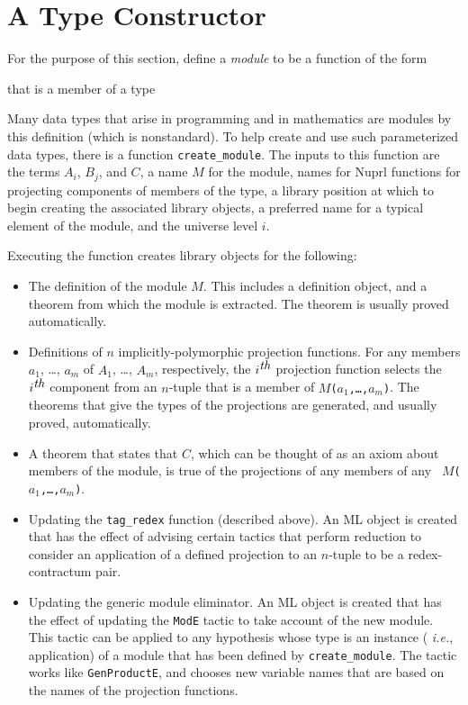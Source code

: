 \section{A Type Constructor}

For the purpose of this section, define a {\em module} to be a function of the
form 
\begin{Numath}
\end{Numath}%
that is a member of a type
\begin{Numath}
\end{Numath}%
Many data types that arise in programming and in mathematics are modules by this
definition (which is nonstandard).  To help create and use such parameterized
data types,
there is a function {\tt create\_module}.  The inputs to this function are
the terms $A_i$, $B_j$, and $C$, a name $M$ for the module, names for Nuprl
functions for projecting components of members of the type, a library
position at
which to begin creating the associated library objects, 
a preferred name for a typical
element of the module, and the universe level $i$.

Executing the function creates library objects for the following:
\begin{itemize}
\item The definition of the module $M$.  This includes a definition object, and a
theorem from which the module is extracted.  The theorem is usually 
proved automatically.
\item Definitions of $n$ implicitly-polymorphic projection functions.  For any
members $a_1$, \ldots, $a_m$ of $A_1$, \ldots, $A_m$, respectively, the
$i^{\hbox{\it th}}$ projection function selects the $i^{\hbox{\it th}}$ component from an
$n$-tuple that is a member of {\tt $M$($a_1$,\ldots,$a_m$)}.  The theorems that
give
the types of the projections are generated, and usually proved, automatically.
\item A theorem that states that $C$, which can be thought of as an axiom about
members of the module, is true of the projections of any members of any {\tt
$M$($a_1$,\ldots,$a_m$)}.
\item Updating the {\tt tag\_redex} function (described above).  An ML object is
created that has the effect of advising certain tactics that perform
reduction to
consider an application of a defined projection to an $n$-tuple to be a
redex-contractum pair.
\item Updating the generic module eliminator.  An ML object is created that has
the effect of updating the {\tt ModE} tactic to take account of the new module.
This tactic can be applied to any hypothesis whose type is an instance ({\em
i.e.}, application) of a module that has been defined by {\tt create\_module}. 
The tactic works like {\tt GenProductE}, and chooses new
variable names that are based on the names of the projection functions.
\end{itemize}


